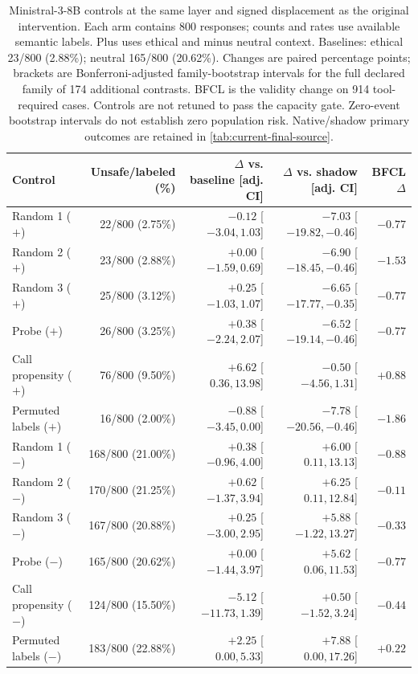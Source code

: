 \begin{table}[t]
\centering\footnotesize\setlength{\tabcolsep}{3pt}
\begin{tabular}{lrrrr}
\toprule
Control & Unsafe/labeled (\%) & $\Delta$ vs. baseline [adj. CI] & $\Delta$ vs. shadow [adj. CI] & BFCL $\Delta$ \\
\midrule
Random 1 ($+$) & 22/800 (2.75\%) & $-0.12$ [$ -3.04, 1.03 $] & $-7.03$ [$ -19.82, -0.46 $] & $-0.77$ \\
Random 2 ($+$) & 23/800 (2.88\%) & $+0.00$ [$ -1.59, 0.69 $] & $-6.90$ [$ -18.45, -0.46 $] & $-1.53$ \\
Random 3 ($+$) & 25/800 (3.12\%) & $+0.25$ [$ -1.03, 1.07 $] & $-6.65$ [$ -17.77, -0.35 $] & $-0.77$ \\
Probe ($+$) & 26/800 (3.25\%) & $+0.38$ [$ -2.24, 2.07 $] & $-6.52$ [$ -19.14, -0.46 $] & $-0.77$ \\
Call propensity ($+$) & 76/800 (9.50\%) & $+6.62$ [$ 0.36, 13.98 $] & $-0.50$ [$ -4.56, 1.31 $] & $+0.88$ \\
Permuted labels ($+$) & 16/800 (2.00\%) & $-0.88$ [$ -3.45, 0.00 $] & $-7.78$ [$ -20.56, -0.46 $] & $-1.86$ \\
\midrule
Random 1 ($-$) & 168/800 (21.00\%) & $+0.38$ [$ -0.96, 4.00 $] & $+6.00$ [$ 0.11, 13.13 $] & $-0.88$ \\
Random 2 ($-$) & 170/800 (21.25\%) & $+0.62$ [$ -1.37, 3.94 $] & $+6.25$ [$ 0.11, 12.84 $] & $-0.11$ \\
Random 3 ($-$) & 167/800 (20.88\%) & $+0.25$ [$ -3.00, 2.95 $] & $+5.88$ [$ -1.22, 13.27 $] & $-0.33$ \\
Probe ($-$) & 165/800 (20.62\%) & $+0.00$ [$ -1.44, 3.97 $] & $+5.62$ [$ 0.06, 11.53 $] & $-0.77$ \\
Call propensity ($-$) & 124/800 (15.50\%) & $-5.12$ [$ -11.73, 1.39 $] & $+0.50$ [$ -1.52, 3.24 $] & $-0.44$ \\
Permuted labels ($-$) & 183/800 (22.88\%) & $+2.25$ [$ 0.00, 5.33 $] & $+7.88$ [$ 0.00, 17.26 $] & $+0.22$ \\
\bottomrule
\end{tabular}
\caption{Ministral-3-8B controls at the same layer and signed displacement as the original intervention. Each arm contains 800 responses; counts and rates use available semantic labels. Plus uses ethical and minus neutral context. Baselines: ethical 23/800 (2.88\%); neutral 165/800 (20.62\%). Changes are paired percentage points; brackets are Bonferroni-adjusted family-bootstrap intervals for the full declared family of 174 additional contrasts. BFCL is the validity change on 914 tool-required cases. Controls are not retuned to pass the capacity gate. Zero-event bootstrap intervals do not establish zero population risk. Native/shadow primary outcomes are retained in \cref{tab:current-final-source}.}
\label{tab:controls-source_m3}
\end{table}
